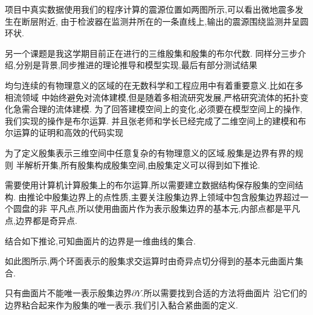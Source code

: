 \documentclass[UTF8]{ctexbeamer}	%
\theoremstyle{plain}
\theoremstyle{definition}
\theoremstyle{remark}
\numberwithin{equation}{section}
\begin{document}
\begin{frame}
    项目中真实数据使用我们的程序计算的震源位置如两图所示,可以看出微地震多发生在断层附近,
    由于检波器在监测井所在的一条直线上,输出的震源围绕监测井呈圆环状.
\end{frame}

\begin{frame}
    另一个课题是我这学期目前正在进行的三维殷集和殷集的布尔代数.
    同样分三步介绍,分别是背景,同步推进的理论推导和模型实现,最后有部分测试结果
\end{frame}

\begin{frame}
    均匀连续的有物理意义的区域的在无数科学和工程应用中有着重要意义.比如在多相流领域
    中始终避免对流体建模,但是随着多相流研究发展,严格研究流体的拓扑变化急需合理的流体建模.
    为了回答建模空间上的变化,必须要在模型空间上的操作,我们实现的操作是布尔运算.
    并且张老师和学长已经完成了二维空间上的建模和布尔运算的证明和高效的代码实现
\end{frame}

\begin{frame}
    为了定义殷集表示三维空间中任意复杂的有物理意义的区域.殷集是边界有界的规则
    半解析开集,所有殷集构成殷集空间,由殷集定义可以得到如下推论.
\end{frame}

\begin{frame}
    需要使用计算机计算殷集上的布尔运算,所以需要建立数据结构保存殷集的空间结构.
    由推论中殷集边界上的点性质,主要关注殷集边界上领域中包含殷集边界超过一个圆盘的非
    平凡点,所以使用曲面片作为表示殷集边界的基本元,内部点都是平凡点,边界都是奇异点.

    结合如下推论,可知曲面片的边界是一维曲线的集合.

\end{frame}

\begin{frame}
    如此图所示,两个环面表示的殷集求交运算时由奇异点切分得到的基本元曲面片集合.
\end{frame}

\begin{frame}
    只有曲面片不能唯一表示殷集边界$\partial Y$.所以需要找到合适的方法将曲面片
    沿它们的边界粘合起来作为殷集的唯一表示.我们引入黏合紧曲面的定义.
\end{frame}



\end{document}
